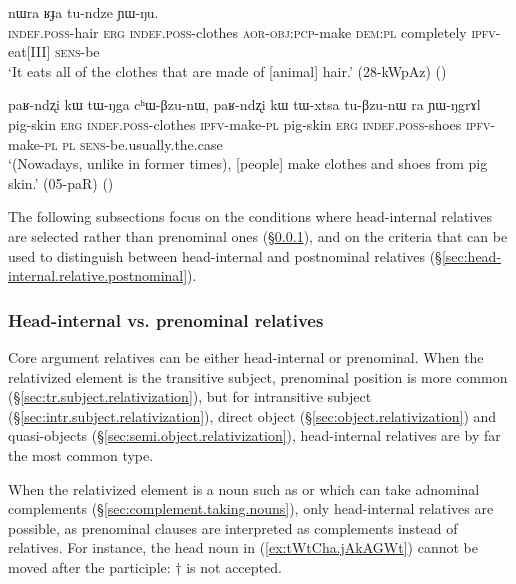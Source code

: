 \begin{exe}
\ex \label{ex:tWNga.thWkABzu}
 nɯra ʁɟa tu-ndze ɲɯ-ŋu. \\
\textsc{indef}.\textsc{poss}-hair \textsc{erg} \textsc{indef}.\textsc{poss}-clothes \textsc{aor}-\textsc{obj}:\textsc{pcp}-make \textsc{dem}:\textsc{pl} completely \textsc{ipfv}-eat[III] \textsc{sens}-be \\
\glt `It eats all of the clothes that are made of [animal] hair.' (28-kWpAz)
()
\end{exe} 

\begin{exe}
\ex \label{ex:tWNga.chWBzunW}
\gll paʁ-ndʐi kɯ tɯ-ŋga cʰɯ-βzu-nɯ, paʁ-ndʐi kɯ tɯ-xtsa tu-βzu-nɯ ra ɲɯ-ŋgrɤl \\
pig-skin \textsc{erg} \textsc{indef}.\textsc{poss}-clothes \textsc{ipfv}-make-\textsc{pl} pig-skin \textsc{erg} \textsc{indef}.\textsc{poss}-shoes \textsc{ipfv}-make-\textsc{pl} \textsc{pl} \textsc{sens}-be.usually.the.case \\
\glt `(Nowadays, unlike in former times), [people] make clothes and shoes from pig skin.' (05-paR)
()
\end{exe} 

The following subsections focus on the conditions where head-internal relatives are selected rather than prenominal ones (§\ref{sec:head-internal.relative.prenominal}), and on the criteria that can be used to distinguish between head-internal and postnominal relatives (§\ref{sec:head-internal.relative.postnominal}).

\subsubsection{Head-internal vs. prenominal relatives} \label{sec:head-internal.relative.prenominal}
Core argument relatives can be either head-internal or prenominal. When the relativized element is the transitive subject, prenominal position is more common (§\ref{sec:tr.subject.relativization}), but for intransitive subject (§\ref{sec:intr.subject.relativization}), direct object (§\ref{sec:object.relativization}) and quasi-objects (§\ref{sec:semi.object.relativization}), head-internal relatives are by far the most common type. 

When the relativized element is a noun such as  or  which can take adnominal complements (§\ref{sec:complement.taking.nouns}), only head-internal relatives are possible, as prenominal clauses are interpreted as complements instead of relatives. For instance, the head noun  in  (\ref{ex:tWtCha.jAkAGWt}) cannot be moved after the participle: $\dagger$ is not accepted.


